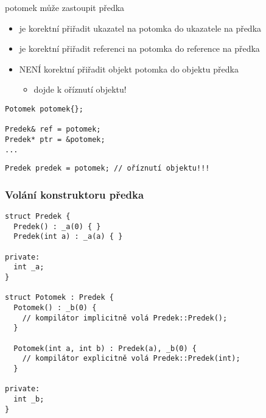 \begin{frame}[fragile]
\begin{bitemize}
\item potomek může zastoupit předka
\begin{itemize}
\item je korektní přiřadit ukazatel na potomka do ukazatele na předka
\item je korektní přiřadit referenci na potomka do reference na předka
\item NENÍ korektní přiřadit objekt potomka do objektu předka
\begin{itemize}
\item dojde k oříznutí objektu!
\end{itemize}
\end{itemize}
\end{bitemize}

\begin{yesblock}
\begin{lstlisting}
Potomek potomek{};

Predek& ref = potomek;
Predek* ptr = &potomek;
...
\end{lstlisting}
\end{yesblock}

\begin{noblock}
\begin{lstlisting}
Predek predek = potomek; // oříznutí objektu!!!
\end{lstlisting}
\end{noblock}
\end{frame}







\begin{frame}[fragile]
\frametitle{Volání konstruktoru předka}

\begin{yesblock}
\begin{lstlisting}[basicstyle=\scriptsize]
struct Predek {
  Predek() : _a(0) { }
  Predek(int a) : _a(a) { }

private:
  int _a;
}

struct Potomek : Predek {
  Potomek() : _b(0) {
    // kompilátor implicitně volá Predek::Predek();
  }

  Potomek(int a, int b) : Predek(a), _b(0) {
    // kompilátor explicitně volá Predek::Predek(int);
  }

private:
  int _b;
}
\end{lstlisting}
\end{yesblock}
\end{frame}


